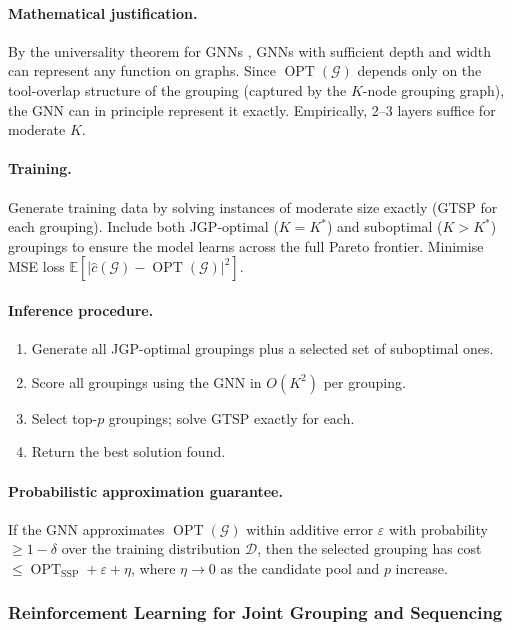 \documentclass[11pt,a4paper]{article}
\theoremstyle{plain}
\theoremstyle{definition}
\DeclareMathOperator{\OPT}{OPT}
\newcommand{\calG}{\mathcal{G}}     %
\newcommand{\Kstar}{K^{*}}          %
\begin{document}
\paragraph{Mathematical justification.}
By the universality theorem for GNNs \cite{Xu2019}, GNNs with sufficient depth and
width can represent any function on graphs. Since $\OPT(\calG)$ depends only on the
tool-overlap structure of the grouping (captured by the $K$-node grouping graph), the
GNN can in principle represent it exactly. Empirically, 2--3 layers suffice for
moderate $K$.

\paragraph{Training.}
Generate training data by solving instances of moderate size exactly (GTSP for each
grouping). Include both JGP-optimal ($K = \Kstar$) and suboptimal ($K > \Kstar$)
groupings to ensure the model learns across the full Pareto frontier. Minimise
MSE loss $\mathbb{E}[|\hat{c}(\calG) - \OPT(\calG)|^2]$.

\paragraph{Inference procedure.}
\begin{enumerate}[label=\arabic*.]
  \item Generate all JGP-optimal groupings plus a selected set of suboptimal ones.
  \item Score all groupings using the GNN in $O(K^2)$ per grouping.
  \item Select top-$p$ groupings; solve GTSP exactly for each.
  \item Return the best solution found.
\end{enumerate}

\paragraph{Probabilistic approximation guarantee.}
If the GNN approximates $\OPT(\calG)$ within additive error $\varepsilon$ with
probability $\ge 1 - \delta$ over the training distribution $\mathcal{D}$, then
the selected grouping has cost $\le \OPT_{\text{SSP}} + \varepsilon + \eta$,
where $\eta \to 0$ as the candidate pool and $p$ increase.

\subsubsection{Reinforcement Learning for Joint Grouping and Sequencing}
\label{sec:RL}
\end{document}
